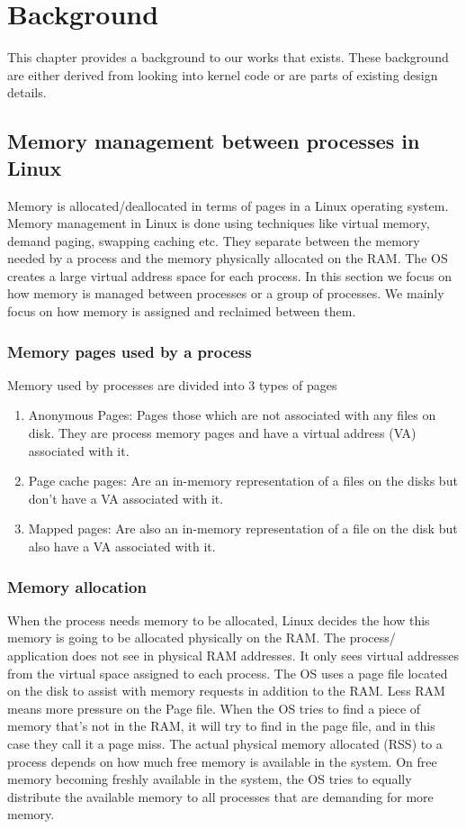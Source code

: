 \chapter{Background}

  This chapter provides a background to our works that exists. These background are either derived from looking into kernel code or 
  are parts of existing design details.
  
  \section{Memory management between processes in Linux}
  
    Memory is allocated/deallocated in terms of pages in a Linux operating system. Memory management in Linux is done using techniques like 
virtual memory, demand paging, swapping caching etc. They separate between the memory needed by a process and the memory physically 
allocated on the RAM. The OS creates a large virtual address space for each process. In this section we focus on how memory is managed 
between processes or a group of processes. We mainly focus on how memory is assigned and reclaimed between them.  
  
    \subsection{Memory pages used by a process}
      Memory used by processes are divided into 3 types of pages	
      \begin{enumerate}	
	\item Anonymous Pages: Pages those which are not associated with any files on disk. They are process memory pages and have a virtual
	address (VA) associated with it.
	\item Page cache pages: Are an in-memory representation of a files on the disks but don't have a VA associated with it.	
	\item Mapped pages: Are also an in-memory representation of a file on the disk but also have a VA associated with it.
      \end{enumerate}
  
    \subsection{Memory allocation}
      When the process needs memory to be allocated, Linux decides the how this memory is going to be allocated physically on the RAM. The 
process/ application does not see in physical RAM addresses. It only sees virtual addresses from the virtual space assigned to each process.
The OS uses a page file located on the disk to assist with memory requests in addition to the RAM. Less RAM means more pressure on the Page 
file. When the OS tries to find a piece of memory that's not in the RAM, it will try to find in the page file, and in this case they call it 
a page miss. The actual physical memory allocated (RSS) to a process depends on how much free memory is available in the system. On free 
memory becoming freshly available in the system, the OS tries to equally distribute the available memory to all processes that are 
demanding for more memory.


